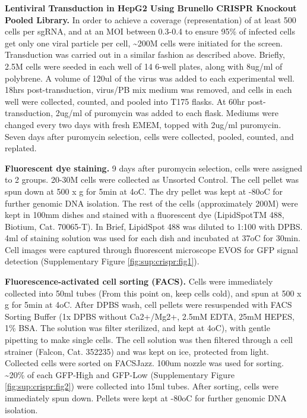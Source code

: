 \documentclass[
  a4paper,
]{article}
\begin{document}
\textbf{Lentiviral Transduction in HepG2 Using Brunello CRISPR Knockout Pooled Library.}
In order to achieve a coverage (representation) of at least 500 cells per sgRNA, and at an MOI between 0.3-0.4 to ensure 95\% of infected cells get only one viral particle per cell, \textasciitilde200M cells were initiated for the screen.
Transduction was carried out in a similar fashion as described above.
Briefly, 2.5M cells were seeded in each well of 14 6-well plates, along with 8ug/ml of polybrene.
A volume of 120ul of the virus was added to each experimental well.
18hrs post-transduction, virus/PB mix medium was removed, and cells in each well were collected, counted, and pooled into T175 flasks.
At 60hr post-transduction, 2ug/ml of puromycin was added to each flask.
Mediums were changed every two days with fresh EMEM, topped with 2ug/ml puromycin.
Seven days after puromycin selection, cells were collected, pooled, counted, and replated.

\textbf{Fluorescent dye staining.}
9 days after puromycin selection, cells were assigned to 2 groups.
20-30M cells were collected as Unsorted Control.
The cell pellet was spun down at 500 x g for 5min at 4oC.
The dry pellet was kept at -80oC for further genomic DNA isolation.
The rest of the cells (approximately 200M) were kept in 100mm dishes and stained with a fluorescent dye (LipidSpotTM 488, Biotium, Cat. 70065-T).
In Brief, LipidSpot 488 was diluted to 1:100 with DPBS.
4ml of staining solution was used for each dish and incubated at 37oC for 30min.
Cell images were captured through fluorescent microscope EVOS for GFP signal detection (Supplementary Figure \ref{fig:sup:crispr:fig1}).

\textbf{Fluorescence-activated cell sorting (FACS).}
Cells were immediately collected into 50ml tubes (From this point on, keep cells cold), and spun at 500 x g for 5min at 4oC.
After DPBS wash, cell pellets were resuspended with FACS Sorting Buffer (1x DPBS without Ca2+/Mg2+, 2.5mM EDTA, 25mM HEPES, 1\% BSA.
The solution was filter sterilized, and kept at 4oC), with gentle pipetting to make single cells.
The cell solution was then filtered through a cell strainer (Falcon, Cat. 352235) and was kept on ice, protected from light.
Collected cells were sorted on FACSJazz.
100um nozzle was used for sorting.
\textasciitilde20\% of each GFP-High and GFP-Low (Supplementary Figure \ref{fig:sup:crispr:fig2}) were collected into 15ml tubes.
After sorting, cells were immediately spun down.
Pellets were kept at -80oC for further genomic DNA isolation.
\end{document}
